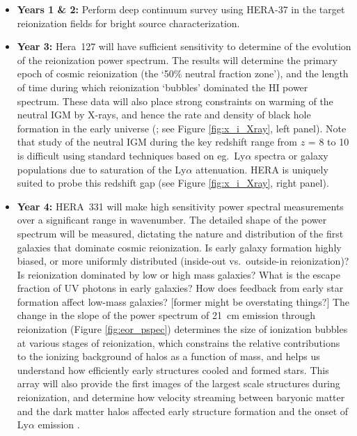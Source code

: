 \documentclass[preprint]{aastex}
\begin{document}
\begin{itemize}\setlength{\parskip}{0pt}\itemsep0pt

\item {\bf Years 1 \& 2:} Perform deep continuum survey using HERA-37 in the target reionization fields for bright source characterization. 

\item {\bf Year 3:} Hera~127 will have sufficient sensitivity to determine of the evolution of the reionization power spectrum. The results will determine the primary epoch of cosmic reionization (the `50\% neutral fraction zone'), and the length of time during which reionization `bubbles' dominated the HI power spectrum. These data will also place strong constraints on warming of the neutral IGM by X-rays, and hence the rate and density of black hole formation in the
early universe (\citealt{pritchard_loeb2010}; see Figure \ref{fig:x_i_Xray}, left panel). Note that study of the neutral IGM during the key redshift range from $z$ = 8 to 10 is difficult using standard techniques based on eg.\ Ly$\alpha$ spectra or galaxy populations due to saturation of the Ly$\alpha$ attenuation. HERA is uniquely suited to probe this redshift gap (see Figure \ref{fig:x_i_Xray}, right panel). 

\item {\bf Year 4:} HERA~331 will make high sensitivity power spectral measurements over a significant range in wavenumber. The detailed shape of the power spectrum will be measured, dictating the nature and distribution of the first galaxies that dominate cosmic  reionization. Is early galaxy formation highly biased, or more uniformly distributed (inside-out vs.\ outside-in reionization)? Is reionization dominated by low or high mass galaxies? What is the escape fraction of UV photons in early galaxies? How does feedback from early star formation affect low-mass galaxies? [former might be overstating things?] The change in the slope of the power spectrum of 21~cm emission through reionization (Figure \ref{fig:eor_pspec}) determines the size of ionization bubbles at various stages of reionization, which constrains the relative contributions to the ionizing background of halos as a function of mass, and helps us understand how efficiently early structures cooled and formed stars. This array will also provide the first images of the largest scale structures during reionization, and determine how velocity streaming between baryonic  matter and the dark matter halos affected early structure formation and the onset of Ly$\alpha$ emission \citep{visbal_et_al2012}.


\end{itemize}
\end{document}
